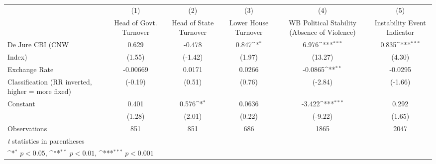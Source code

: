 {
\def\sym#1{\ifmmode^{#1}\else\(^{#1}\)\fi}
\begin{tabular}{l*{5}{c}}
\hline\hline
                    &\multicolumn{1}{c}{(1)}&\multicolumn{1}{c}{(2)}&\multicolumn{1}{c}{(3)}&\multicolumn{1}{c}{(4)}&\multicolumn{1}{c}{(5)}\\
                    &\multicolumn{1}{c}{Head of Govt. Turnover}&\multicolumn{1}{c}{Head of State Turnover}&\multicolumn{1}{c}{Lower House Turnover}&\multicolumn{1}{c}{WB Political Stability (Absence of Violence)}&\multicolumn{1}{c}{Instability Event Indicator}\\
\hline
De Jure CBI (CNW    &       0.629         &      -0.478         &       0.847\sym{*}  &       6.976\sym{***}&       0.835\sym{***}\\
Index)              &      (1.55)         &     (-1.42)         &      (1.97)         &     (13.27)         &      (4.30)         \\
[1em]
Exchange Rate       &    -0.00669         &      0.0171         &      0.0266         &     -0.0865\sym{**} &     -0.0295         \\
Classification (RR inverted, higher = more fixed)&     (-0.19)         &      (0.51)         &      (0.76)         &     (-2.84)         &     (-1.66)         \\
[1em]
Constant            &       0.401         &       0.576\sym{*}  &      0.0636         &      -3.422\sym{***}&       0.292         \\
                    &      (1.28)         &      (2.01)         &      (0.22)         &     (-9.22)         &      (1.65)         \\
\hline
Observations        &         851         &         851         &         686         &        1865         &        2047         \\
\hline\hline
\multicolumn{6}{l}{\footnotesize \textit{t} statistics in parentheses}\\
\multicolumn{6}{l}{\footnotesize \sym{*} \(p<0.05\), \sym{**} \(p<0.01\), \sym{***} \(p<0.001\)}\\
\end{tabular}
}
